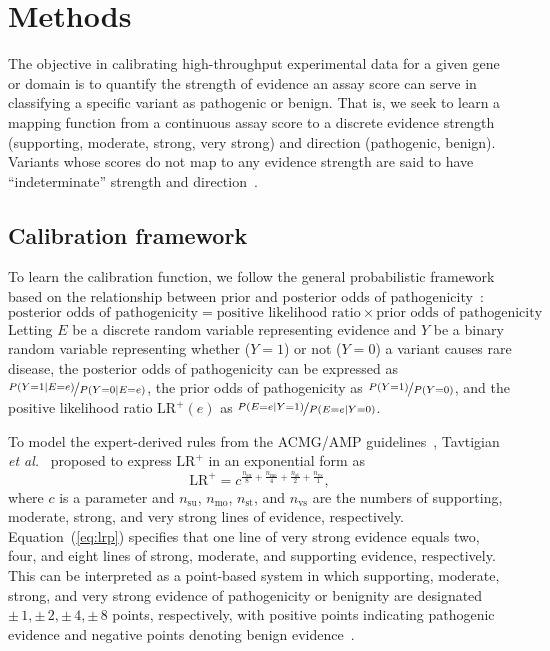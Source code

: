\documentclass[11pt]{article}
\theoremstyle{plain}
\begin{document}
\section*{Methods}
The objective in calibrating high-throughput experimental data for a given gene or domain is to quantify the strength of evidence an assay score can serve in classifying a specific variant as pathogenic or benign. That is, we seek to learn a mapping function from a continuous assay score to a discrete evidence strength (supporting, moderate, strong, very strong) and direction (pathogenic, benign). Variants whose scores do not map to any evidence strength are said to have ``indeterminate'' strength and direction~\cite{pejaver2022calibration}.

\subsection*{Calibration framework}
To learn the calibration function, we follow the general probabilistic framework based on the relationship between prior and posterior odds of pathogenicity~\cite{Glas2003}:
\begin{equation*}
    \text{posterior odds of pathogenicity} = \text{positive likelihood ratio} \times \text{prior odds of pathogenicity}
\end{equation*}
Letting $E$ be a discrete random variable representing evidence and $Y$ be a binary random variable representing whether ($Y=1$) or not ($Y=0$) a variant causes rare disease, the posterior odds of pathogenicity can be expressed as $\nicefrac{P(Y=1|E=e)}{P(Y=0|E=e)}$, the prior odds of pathogenicity as $\nicefrac{P(Y=1)}{P(Y=0)}$, and the positive likelihood ratio $\text{LR}^+(e)$ as $\nicefrac{P(E=e|Y=1)}{P(E=e|Y=0)}$.

To model the expert-derived rules from the ACMG/AMP guidelines~\cite{richards2015standards}, Tavtigian \textit{et al.}~\cite{tavtigian2018modeling} proposed to express $\text{LR}^+$ in an exponential form as
\begin{equation}
    \text{LR}^+=c^{\frac{n_{\mathrm{su}}}{8}+\frac{n_{\mathrm{mo}}}{4}+\frac{n_{\mathrm{st}}}{2}+\frac{n_{\mathrm{vs}}}{1}},
    \label{eq:lrp}
\end{equation}
where $c$ is a parameter and $n_{\mathrm{su}}$, $n_{\mathrm{mo}}$, $n_{\mathrm{st}}$, and $n_{\mathrm{vs}}$ are the numbers of supporting, moderate, strong, and very strong lines of evidence, respectively. Equation~(\ref{eq:lrp}) specifies that one line of very strong evidence equals two, four, and eight lines of strong, moderate, and supporting evidence, respectively. This can be interpreted as a point-based system in which supporting, moderate, strong, and very strong evidence of pathogenicity or benignity are designated $\pm\,1, \pm\,2, \pm\,4, \pm\,8$ points, respectively, with positive points indicating pathogenic evidence and negative points denoting benign evidence~\cite{Tavtigian2020}. %
\end{document}
